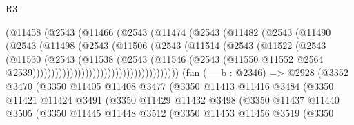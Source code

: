 \begin{lexlean}{R3}
\begin{coremodule}
                                (@11458
                                  (@2543
                                    (@11466
                                      (@2543
                                        (@11474
                                          (@2543
                                            (@11482
                                              (@2543
                                                (@11490
                                                  (@2543
                                                    (@11498
                                                      (@2543
                                                        (@11506
                                                          (@2543
                                                            (@11514
                                                              (@2543
                                                                (@11522
                                                                  (@2543
                                                                    (@11530
                                                                      (@2543
                                                                        (@11538
                                                                          (@2543
                                                                            (@11546
                                                                              (@2543
                                                                                (@11550
                                                                                  @11552
                                                                                  @2564
                                                                                  @2539)))))))))))))))))))))))))))))))))))))))
    (fun (__b : @2346) =>
    @2928
      (@3352
        @3470
        (@3350
          @11405
          @11408
          @3477
          (@3350
            @11413
            @11416
            @3484
            (@3350
              @11421
              @11424
              @3491
              (@3350
                @11429
                @11432
                @3498
                (@3350
                  @11437
                  @11440
                  @3505
                  (@3350
                    @11445
                    @11448
                    @3512
                    (@3350
                      @11453
                      @11456
                      @3519
                      (@3350

\end{coremodule}
\end{lexlean}
